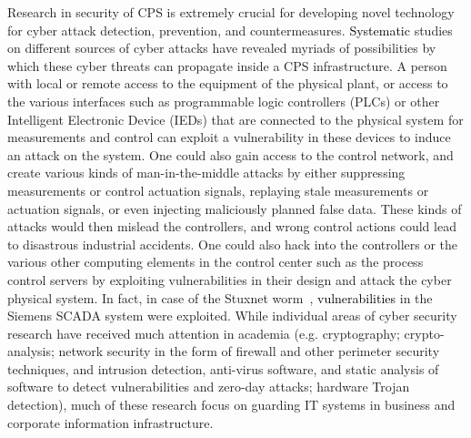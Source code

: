 \noindent
Research in security of CPS is 
extremely crucial for developing novel technology for cyber attack detection, prevention, and countermeasures. \textcolor{black} {Systematic} studies on different sources of cyber attacks have revealed myriads of possibilities by which these cyber threats can 
propagate inside a CPS infrastructure. 
A person with local or remote access
to the equipment of the physical plant, or access to the various interfaces such as programmable
logic controllers (PLCs) or other Intelligent Electronic Device (IEDs) that are connected to the
physical system for measurements and control can exploit a vulnerability in these devices to
induce an attack on the system. One could also gain access to the control network, and create
various kinds of man-in-the-middle attacks by either suppressing measurements or control
actuation signals, replaying stale measurements or actuation signals, or even injecting
maliciously planned false data. These kinds of attacks would then mislead the controllers, and
wrong control actions could lead to disastrous industrial accidents. One could also hack into the
controllers or the various other computing elements in the control center such as the process control servers by
exploiting vulnerabilities in their design and attack the cyber physical system. In fact, in
case of the Stuxnet worm~\cite{stuxnet}, \textcolor{black} {vulnerabilities} in the Siemens SCADA system were exploited. While individual areas of cyber security research have received
much attention in academia (e.g. cryptography; crypto-analysis; network
security in the form of firewall and other perimeter security techniques, and intrusion detection, anti-virus software, and static analysis of software to detect vulnerabilities and zero-day attacks;
hardware Trojan detection), much of these research focus on guarding IT systems in business and corporate information infrastructure. \\ 

